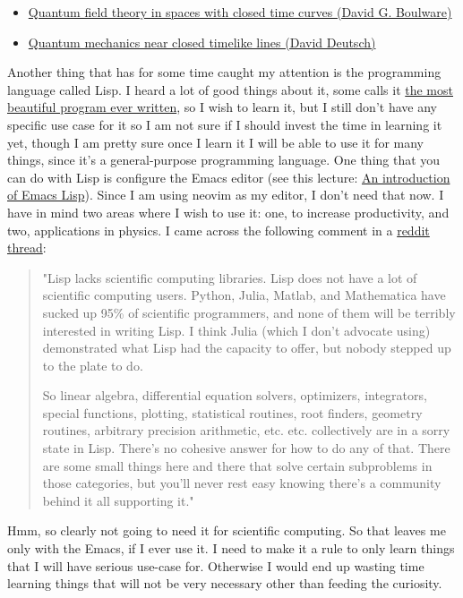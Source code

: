 \documentclass[11pt,a4paper]{article}
\begin{document}
\begin{itemize}
	\item \href{https://sci-hub.usualwant.com/10.1103/PhysRevD.46.4421}{Quantum field theory in spaces with closed time curves (David G. Boulware)}

	\item \href{https://sci-hub.usualwant.com/10.1103/physrevd.44.3197}{Quantum mechanics near closed timelike lines (David Deutsch)}
\end{itemize}

Another thing that has for some time caught my attention is the programming language called Lisp. I heard a lot of good things about it, some calls it \href{https://www.youtube.com/watch?v=OyfBQmvr2Hc&list=PLISEtDmihMo1rzX3l50vAo61bqpK5tF5x&index=1}{the most beautiful program ever written}, so I wish to learn it, but I still don't have any specific use case for it so I am not sure if I should invest the time in learning it yet, though I am pretty sure once I learn it I will be able to use it for many things, since it's a general-purpose programming language. One thing that you can do with Lisp is configure the Emacs editor (see this lecture: \href{https://www.youtube.com/watch?v=2z-YBsd5snY&list=PLISEtDmihMo1rzX3l50vAo61bqpK5tF5x&index=3}{An introduction of Emacs Lisp}). Since I am using neovim as my editor, I don't need that now. I have in mind two areas where I wish to use it: one, to increase productivity, and two, applications in physics. I came across the following comment in a \href{https://www.reddit.com/r/lisp/comments/utuj9i/lisp_for_quantum_simulation/}{reddit thread}: 
\begin{quote}
	"Lisp lacks scientific computing libraries. Lisp does not have a lot of scientific computing users. Python, Julia, Matlab, and Mathematica have sucked up 95\% of scientific programmers, and none of them will be terribly interested in writing Lisp. I think Julia (which I don't advocate using) demonstrated what Lisp had the capacity to offer, but nobody stepped up to the plate to do.

	So linear algebra, differential equation solvers, optimizers, integrators, special functions, plotting, statistical routines, root finders, geometry routines, arbitrary precision arithmetic, etc. etc. collectively are in a sorry state in Lisp. There's no cohesive answer for how to do any of that. There are some small things here and there that solve certain subproblems in those categories, but you'll never rest easy knowing there's a community behind it all supporting it."
\end{quote}
Hmm, so clearly not going to need it for scientific computing. So that leaves me only with the Emacs, if I ever use it. I need to make it a rule to only learn things that I will have serious use-case for. Otherwise I would end up wasting time learning things that will not be very necessary other than feeding the curiosity. 
\end{document}

